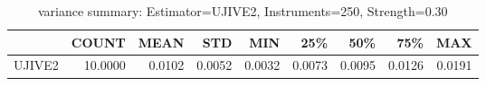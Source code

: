 \begin{table}[ht]
\centering
\caption{variance summary: Estimator=UJIVE2, Instruments=250, Strength=0.30}
\begin{tabular}{lrrrrrrrr}
\toprule
 & COUNT & MEAN & STD & MIN & 25\% & 50\% & 75\% & MAX \\
\midrule
UJIVE2 & 10.0000 & 0.0102 & 0.0052 & 0.0032 & 0.0073 & 0.0095 & 0.0126 & 0.0191 \\
\bottomrule
\end{tabular}
\end{table}
